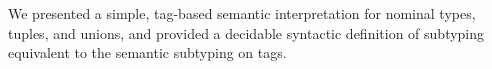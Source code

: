 We presented a simple, tag-based semantic interpretation 
for nominal types, tuples, and unions, 
and provided a decidable syntactic definition of subtyping 
equivalent to the semantic subtyping on tags.

